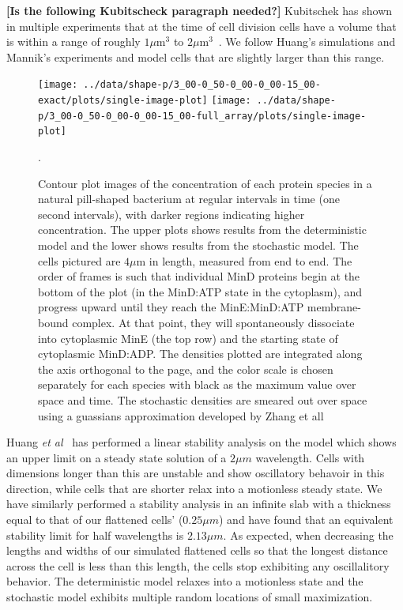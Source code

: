 \documentclass[letterpaper,twocolumn,amsmath,amssymb,pre]{revtex4-1}
\newcommand{\red}[1]{{\bf \color{red} #1}}
\newcommand{\fixme}[1]{\red{[#1]}}
\newcommand\micron{\ensuremath{\mu\text{m}}}
\begin{document}

\fixme{Is the following Kubitscheck paragraph needed?}
Kubitschek has shown in multiple experiments that at the time of cell
division cells have a volume that is within a range of roughly
$1\micron^3$ to $2\micron^3$~\cite{kubitschek1990cell,
  kubitschek1968linear}.  We follow Huang's
simulations\cite{huang2003dynamic} and Mannik's experiments and model
cells that are slightly larger than this range.

\begin{figure}
  \texttt{[image: ../data/shape-p/3\_00-0\_50-0\_00-0\_00-15\_00-exact/plots/single-image-plot]}
  \texttt{[image: ../data/shape-p/3\_00-0\_50-0\_00-0\_00-15\_00-full\_array/plots/single-image-plot]}
  \caption{Contour plot images of the concentration of each protein
    species in a natural pill-shaped bacterium at regular intervals in
    time (one second intervals), with darker regions indicating higher
    concentration. The upper plots shows results from the
    deterministic model and the lower shows results from the
    stochastic model.  The cells pictured are $4\micron$ in
    length, measured from end to end.  The order of frames is such
    that individual MinD proteins begin at the bottom of the plot (in
    the MinD:ATP state in the cytoplasm), and progress upward until
    they reach the MinE:MinD:ATP membrane-bound complex.  At that
    point, they will spontaneously dissociate into cytoplasmic MinE
    (the top row) and the starting state of cytoplasmic MinD:ADP.  The
    densities plotted are integrated along the axis orthogonal to the
    page, and the color scale is chosen separately for each species
    with black as the maximum value over space and time.  The
    stochastic densities are smeared out over space using a guassians
    approximation developed by Zhang et all~\cite{zhang2007gaussian}}.
  \label{image-p}
\end{figure}

Huang \emph{et al}~\cite{huang2003dynamic} has performed a linear
stability analysis on the model which shows an upper limit on a steady
state solution of a $2\mu m$ wavelength.  Cells with dimensions longer
than this are unstable and show oscillatory behavoir in this
direction, while cells that are shorter relax into a motionless steady
state.  We have similarly performed a stability analysis in an
infinite slab with a thickness equal to that of our flattened cells'
($0.25\mu m$) and have found that an equivalent stability limit for
half wavelengths is $2.13\mu m$. As expected, when decreasing the
lengths and widths of our simulated flattened cells so that the
longest distance across the cell is less than this length, the cells
stop exhibiting any oscillalitory behavior.  The deterministic model
relaxes into a motionless state and the stochastic model exhibits
multiple random locations of small maximization.
\end{document}
